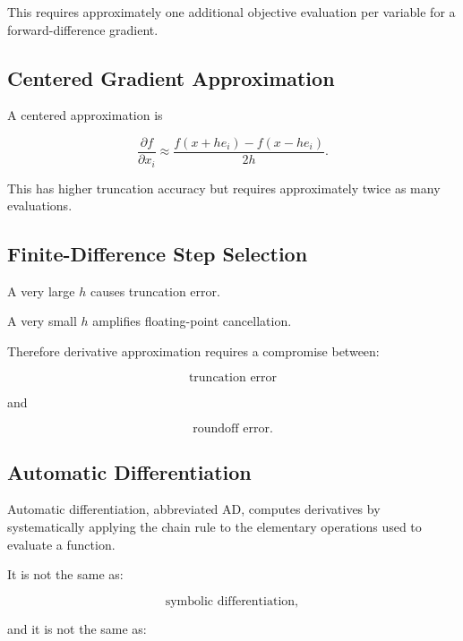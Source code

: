 This requires approximately one additional objective evaluation per
variable for a forward-difference gradient.

\subsection{Centered Gradient Approximation}
\label{subsec:centered-gradient-approximation}

A centered approximation is

\[
\boxed{
\frac{
\partial f
}{
\partial x_i
}
\approx
\frac{
f(x+he_i)
-
f(x-he_i)
}{
2h
}.
}
\]

This has higher truncation accuracy but requires approximately twice as
many evaluations.

\subsection{Finite-Difference Step Selection}
\label{subsec:optimization-finite-difference-step}

A very large \(h\) causes truncation error.

A very small \(h\) amplifies floating-point cancellation.

Therefore derivative approximation requires a compromise between:

\[
\boxed{
\text{truncation error}
}
\]

and

\[
\boxed{
\text{roundoff error}.
}
\]

\subsection{Automatic Differentiation}
\label{subsec:automatic-differentiation}

Automatic differentiation, abbreviated AD, computes derivatives by
systematically applying the chain rule to the elementary operations used
to evaluate a function.

It is not the same as:

\[
\boxed{
\text{symbolic differentiation},
}
\]

and it is not the same as:

